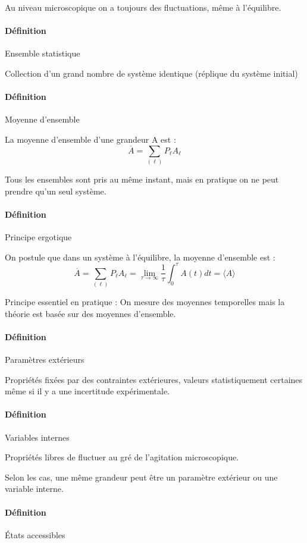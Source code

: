 \documentclass[12pt,a4paper]{report}
\begin{document}
Au niveau microscopique on a toujours des fluctuations, même à l'équilibre.

\paragraph{Définition} Ensemble statistique

Collection d'un grand nombre de système identique (réplique du système initial)

\paragraph{Définition} Moyenne d'ensemble

La moyenne d'ensemble d'une grandeur A est :
\[
	\overline{A} = \sum_{(\ell)} P_\ell A_\ell
\]

Tous les ensembles sont pris au même instant, mais en pratique on ne peut prendre qu'un seul système.

\paragraph{Définition} Principe ergotique

On postule que dans un système à l'équilibre, la moyenne d'ensemble est :
\[
	\overline{A} = \sum_{(\ell)} P_\ell A_\ell = \underset{\tau \rightarrow \infty}{\lim} \dfrac{1}{\tau} \int_0^\tau A(t) dt = \langle A \rangle
\]

Principe essentiel en pratique : On mesure des moyennes temporelles mais la théorie est basée sur des moyennes d'ensemble.

\paragraph{Définition} Paramètres extérieurs

Propriétés fixées par des contraintes extérieures, valeurs statistiquement certaines même si il y a une incertitude expérimentale.

\paragraph{Définition} Variables internes

Propriétés libres de fluctuer au gré de l'agitation microscopique.

Selon les cas, une même grandeur peut être un paramètre extérieur ou une variable interne.

\paragraph{Définition} États accessibles
\end{document}
